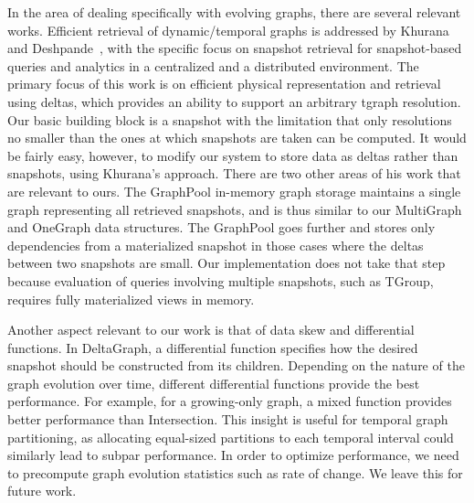 In the area of dealing specifically with evolving graphs, there are
several relevant works.  Efficient retrieval of dynamic/temporal
graphs is addressed by Khurana and Deshpande~\cite{Khurana2003}, with
the specific focus on snapshot retrieval for snapshot-based queries
and analytics in a centralized and a distributed environment.  The
primary focus of this work is on efficient physical representation and
retrieval using deltas, which provides an ability to support an
arbitrary tgraph resolution.  Our basic building block is a snapshot
with the limitation that only resolutions no smaller than the ones at
which snapshots are taken can be computed.  It would be fairly easy,
however, to modify our system to store data as deltas rather than
snapshots, using Khurana's approach.  There are two other areas of his
work that are relevant to ours.  The GraphPool in-memory graph storage
maintains a single graph representing all retrieved snapshots, and is
thus similar to our MultiGraph and OneGraph data structures.  The
GraphPool goes further and stores only dependencies from a
materialized snapshot in those cases where the deltas between two
snapshots are small.  Our implementation does not take that step
because evaluation of queries involving multiple snapshots, such as
TGroup, requires fully materialized views in memory.

Another aspect relevant to our work is that of data skew and
differential functions.  In DeltaGraph, a differential function
specifies how the desired snapshot should be constructed from its
children.  Depending on the nature of the graph evolution over time,
different differential functions provide the best performance.  For
example, for a growing-only graph, a mixed function provides better
performance than Intersection.  This insight is useful for temporal
graph partitioning, as allocating equal-sized partitions to each
temporal interval could similarly lead to subpar performance.  In order
to optimize performance, we need to precompute graph evolution
statistics such as rate of change.  We leave this for future
work. 

